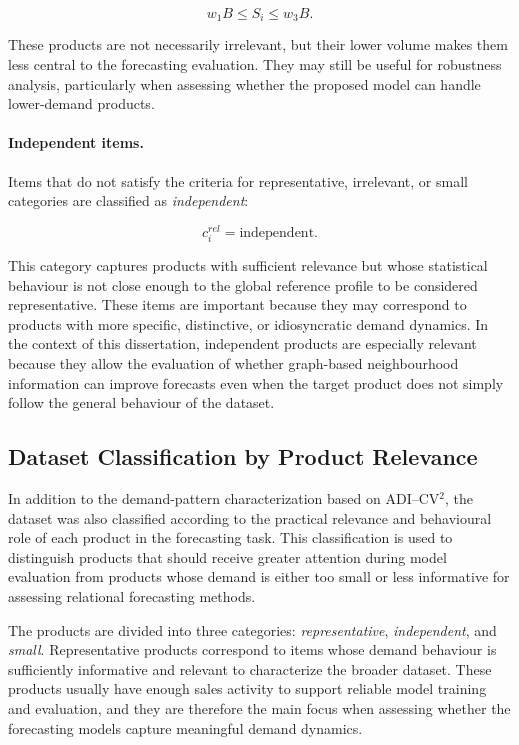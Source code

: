 \begin{equation}
    w_1 B \leq S_i \leq w_3 B.
    \label{eq:small_condition}
\end{equation}

These products are not necessarily irrelevant, but their lower volume makes them less central to the forecasting evaluation. They may still be useful for robustness analysis, particularly when assessing whether the proposed model can handle lower-demand products.

\paragraph{Independent items.}
Items that do not satisfy the criteria for representative, irrelevant, or small categories are classified as \textit{independent}:

\begin{equation}
    c_i^{rel} =
    \text{independent}.
    \label{eq:independent_condition}
\end{equation}

This category captures products with sufficient relevance but whose statistical behaviour is not close enough to the global reference profile to be considered representative. These items are important because they may correspond to products with more specific, distinctive, or idiosyncratic demand dynamics. In the context of this dissertation, independent products are especially relevant because they allow the evaluation of whether graph-based neighbourhood information can improve forecasts even when the target product does not simply follow the general behaviour of the dataset.

\subsection{Dataset Classification by Product Relevance}
\label{subsec:dataset_product_classification}

In addition to the demand-pattern characterization based on ADI--CV\(^2\), the dataset was also classified according to the practical relevance and behavioural role of each product in the forecasting task. This classification is used to distinguish products that should receive greater attention during model evaluation from products whose demand is either too small or less informative for assessing relational forecasting methods.

The products are divided into three categories: \textit{representative}, \textit{independent}, and \textit{small}. Representative products correspond to items whose demand behaviour is sufficiently informative and relevant to characterize the broader dataset. These products usually have enough sales activity to support reliable model training and evaluation, and they are therefore the main focus when assessing whether the forecasting models capture meaningful demand dynamics.

